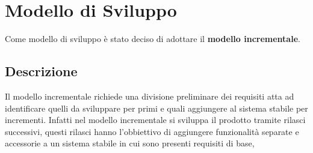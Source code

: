 \section{Modello di Sviluppo}
Come modello di sviluppo è stato deciso di adottare il \textbf{modello incrementale}.
\subsection{Descrizione}
Il modello incrementale richiede una divisione preliminare dei requisiti atta ad identificare quelli da sviluppare per primi e quali aggiungere al sistema 
stabile per incrementi.
Infatti nel modello incrementale si sviluppa il prodotto tramite rilasci successivi, questi rilasci hanno l'obbiettivo di aggiungere funzionalità separate e accessorie 
a un sistema stabile in cui sono presenti requisiti di base,  

